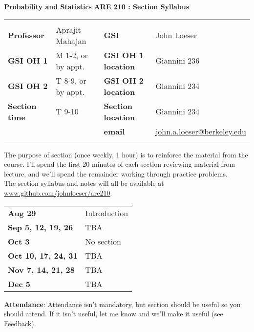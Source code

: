 \documentclass[twoside]{article}
\begin{document}
	
	{\bf Probability and Statistics} \hfill {\bf
		ARE 210 : Section Syllabus}
	
	\vspace{0.5em}
	
	\begin{tabular*}{\textwidth}{l@{\extracolsep{\fill}}ll@{\extracolsep{\fill}}l}
		\hline
		\multicolumn{4}{c}{} \\ [-0.5em]
		{\bf Professor} & Aprajit Mahajan & {\bf GSI} & John Loeser \\
		{\bf GSI OH 1} & M 1-2, or by appt. & {\bf GSI OH 1 location} & Giannini 236 \\
		{\bf GSI OH 2} & T 8-9, or by appt. & {\bf GSI OH 2 location} & Giannini 234 \\
		{\bf Section time} & T 9-10 & {\bf Section location} & Giannini 234 \\
		& & {\bf email} & \href{mailto:john.a.loeser@berkeley.edu}{john.a.loeser@berkeley.edu} \\
		\multicolumn{4}{c}{} \\ [-0.5em]
		\hline
	\end{tabular*}
	\vspace{10pt} \bigskip
	
	The purpose of section (once weekly, 1 hour) is to reinforce the material from the course. I'll spend the first 20 minutes of each section reviewing material from lecture, and we'll spend the remainder working through practice problems. \\
	
	The section syllabus and notes will all be available at \href{http://www.github.com/johnloeser/are210}{www.github.com/johnloeser/are210}.
	
	\vspace{10pt}
	\begin{tabular}{ll}
		\bf{Aug 29}  &  Introduction \\
		\bf{Sep 5, 12, 19, 26} &  TBA \\
		\bf{Oct 3} &  No section \\
		\bf{Oct 10, 17, 24, 31} &  TBA \\
		\bf{Nov 7, 14, 21, 28} & TBA \\
		\bf{Dec 5} & TBA \\
	\end{tabular}
	\bigskip
	
	{\bf Attendance}: Attendance isn't mandatory, but section should be useful so you should attend. If it isn't useful, let me know and we'll make it useful (see Feedback). \\
	
\end{document}
